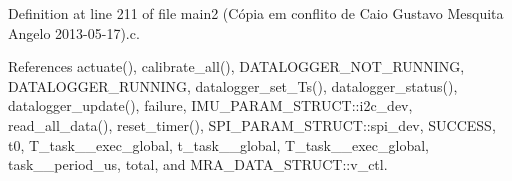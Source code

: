 Definition at line 211 of file main2 (\-Cópia em conflito de Caio Gustavo Mesquita Angelo 2013-\/05-\/17).\-c.



References actuate(), calibrate\-\_\-all(), D\-A\-T\-A\-L\-O\-G\-G\-E\-R\-\_\-\-N\-O\-T\-\_\-\-R\-U\-N\-N\-I\-N\-G, D\-A\-T\-A\-L\-O\-G\-G\-E\-R\-\_\-\-R\-U\-N\-N\-I\-N\-G, datalogger\-\_\-set\-\_\-\-Ts(), datalogger\-\_\-status(), datalogger\-\_\-update(), failure, I\-M\-U\-\_\-\-P\-A\-R\-A\-M\-\_\-\-S\-T\-R\-U\-C\-T\-::i2c\-\_\-dev, read\-\_\-all\-\_\-data(), reset\-\_\-timer(), S\-P\-I\-\_\-\-P\-A\-R\-A\-M\-\_\-\-S\-T\-R\-U\-C\-T\-::spi\-\_\-dev, S\-U\-C\-C\-E\-S\-S, t0, T\-\_\-task\-\_\-\_\-exec\-\_\-global, t\-\_\-task\-\_\-\_\-global, T\-\_\-task\-\_\-\_\-exec\-\_\-global, task\-\_\-\_\-period\-\_\-us, total, and M\-R\-A\-\_\-\-D\-A\-T\-A\-\_\-\-S\-T\-R\-U\-C\-T\-::v\-\_\-ctl.


